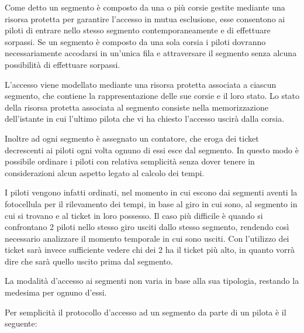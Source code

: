 \documentclass[a4paper,11pt, twoside]{book}
\begin{document}
      Come detto un segmento è composto da una o più corsie gestite mediante una risorsa protetta per garantire
      l'accesso in mutua esclusione, esse consentono ai piloti di entrare nello stesso segmento 
      contemporaneamente e di effettuare sorpassi.
      Se un segmento è composto da una sola corsia i piloti dovranno necessariamente accodarsi in un'unica fila e attraversare
      il segmento senza alcuna possibilità di effettuare sorpassi.
      
      L'accesso viene modellato mediante una risorsa protetta associata a ciascun segmento, che contiene
      la rappresentazione delle sue corsie e il loro stato. Lo stato della risorsa protetta associata al segmento
      consiste nella memorizzazione dell'istante in cui l'ultimo pilota che vi ha chiesto l'accesso uscirà dalla corsia.
      
      Inoltre ad ogni segmento è assegnato un contatore, che eroga dei ticket decrescenti ai piloti ogni volta ognuno di
      essi esce dal segmento. In questo modo è possibile ordinare i piloti con relativa semplicità senza
      dover tenere in considerazioni alcun aspetto legato al calcolo dei tempi. 
      
      I piloti vengono infatti ordinati, nel momento in cui escono dai segmenti aventi la fotocellula per il rilevamento dei tempi,
      in base al giro in cui sono, al segmento in cui si trovano e al ticket in loro possesso.
      Il caso più difficile è quando si confrontano 2 piloti nello stesso giro usciti dallo stesso segmento,
      rendendo così necessario analizzare il momento temporale in cui sono usciti. Con l'utilizzo dei ticket sarà invece
      sufficiente vedere chi dei 2 ha il ticket più alto, in quanto vorrà dire che sarà quello uscito prima dal segmento.
      
      La modalità d'accesso ai segmenti non varia in base alla sua tipologia, restando la medesima per ognuno d'essi.
      
      Per semplicità il protocollo d'accesso ad un segmento da parte di un pilota è il seguente:
      
\end{document}
